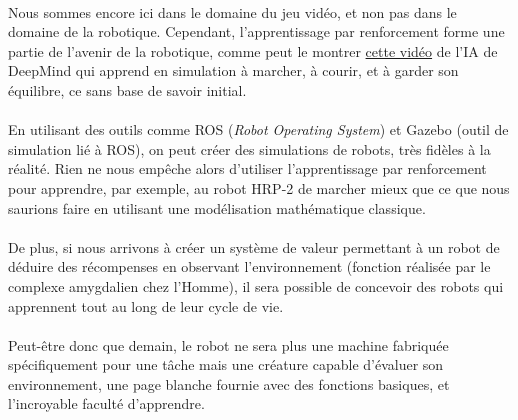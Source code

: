 \documentclass[a4paper,10pt]{article}
\begin{document}
                \paragraph{}
                    Nous sommes encore ici dans le domaine du jeu vidéo, et non pas dans le
                    domaine de la robotique. Cependant, l'apprentissage par renforcement forme 
                    une partie de l'avenir de la robotique, comme peut le montrer \href{https://www.youtube.com/watch?v=gn4nRCC9TwQ}{cette vidéo} 
                    de l'IA de DeepMind qui apprend en simulation à marcher, à courir, et à 
                    garder son équilibre, ce sans base de savoir initial. 
                    
                \paragraph{}
                    En utilisant des outils comme ROS (\textit{Robot Operating System}) et 
                    Gazebo (outil de simulation lié à ROS), on peut créer des simulations
                    de robots, très fidèles à la réalité. Rien ne nous empêche alors 
                    d'utiliser l'apprentissage par renforcement pour apprendre, par 
                    exemple, au robot HRP-2 de marcher mieux que ce que nous saurions 
                    faire en utilisant une modélisation mathématique classique. 
                    
                \paragraph{} 
                    De plus, si nous arrivons à créer un système de valeur permettant 
                    à un robot de déduire des récompenses en observant l'environnement
                    (fonction réalisée par le complexe amygdalien chez l'Homme), il sera possible
                     de concevoir des robots qui apprennent tout au long de leur cycle de vie.
                     
                \paragraph{}
                    Peut-être donc que demain, le robot ne sera plus une machine fabriquée
                    spécifiquement pour une tâche mais une créature capable d'évaluer son environnement, 
                    une page blanche fournie avec des fonctions basiques, et l'incroyable faculté d'apprendre.
                    
\end{document}
